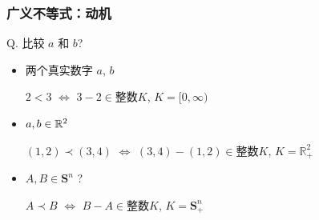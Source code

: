 \documentclass[handout]{beamer}
\begin{document}
\begin{frame}
\frametitle{广义不等式：动机}

Q. 比较   $a$ 和 $b$?
\begin{itemize}
  \item 两个真实数字 $a$, $b$

     $2<3 $ $\Leftrightarrow$ $3-2 \in \textbf{整数} K$, $K = [0,\infty)$

  \item  $a,b\in \mathbb{R}^2$

    $(1,2)\prec (3,4)$ $\Leftrightarrow$ $(3,4)-(1,2) \in \textbf{整数} K$, $K = \mathbb{R}_{+}^2$

  \item $A,B \in \mathbf{S}_{}^{n}$ ?
  
   $A\prec B $ $\Leftrightarrow$ $B-A \in \textbf{整数} K$, $K = \mathbf{S}_{+}^n$

\end{itemize}


\end{frame}
\end{document}
